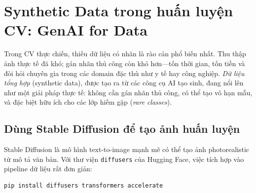 \section{Synthetic Data trong huấn luyện CV: GenAI for Data}
\label{sec:synthetic_data}

Trong CV thực chiến, thiếu dữ liệu có nhãn là rào cản phổ biến nhất. Thu thập ảnh thực tế đã khó; gán nhãn thủ công còn khó hơn---tốn thời gian, tốn tiền và đòi hỏi chuyên gia trong các domain đặc thù như y tế hay công nghiệp. \textit{Dữ liệu tổng hợp} (synthetic data), được tạo ra từ các công cụ AI tạo sinh, đang nổi lên như một giải pháp thực tế: không cần gán nhãn thủ công, có thể tạo vô hạn mẫu, và đặc biệt hữu ích cho các lớp hiếm gặp (\textit{rare classes}).

\subsection*{Dùng Stable Diffusion để tạo ảnh huấn luyện}

Stable Diffusion là mô hình text-to-image mạnh mẽ có thể tạo ảnh photorealistic từ mô tả văn bản. Với thư viện \texttt{diffusers} của Hugging Face, việc tích hợp vào pipeline dữ liệu rất đơn giản:

\begin{verbatim}
pip install diffusers transformers accelerate
\end{verbatim}

